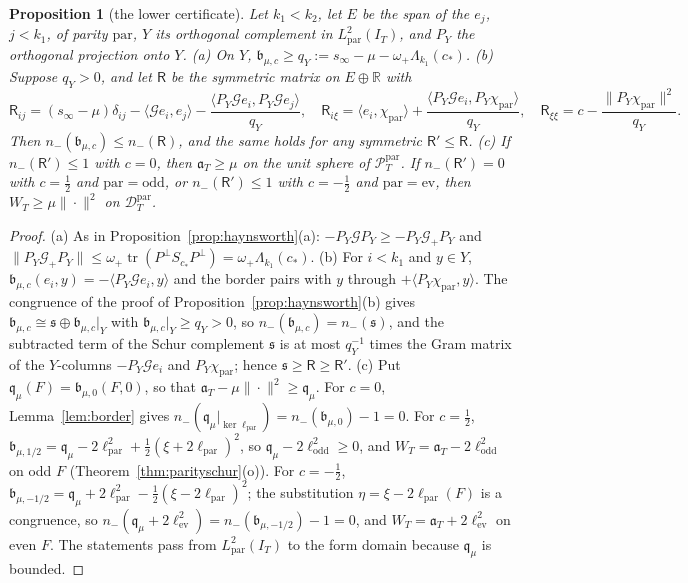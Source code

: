 \documentclass[11pt]{amsart}
\newtheorem{proposition}[theorem]{Proposition}
\theoremstyle{definition}
\theoremstyle{remark}
\newcommand{\R}{\mathbb R}
\newcommand{\PT}{\mathcal P_T}
\newcommand{\IT}{I_T}
\begin{document}
\begin{proposition}[the lower certificate]\label{prop:lowercert}
Let $k_1<k_2$, let $E$ be the span of the $e_j$, $j<k_1$, of parity $\mathrm{par}$, $Y$ its orthogonal
complement in $L^2_{\mathrm{par}}(\IT)$, and $P_Y$ the orthogonal projection onto $Y$.
\emph{(a)} On $Y$, $\mathfrak b_{\mu,c}\ge q_Y:=s_\infty-\mu-\omega_+\Lambda_{k_1}(c_*)$.
\emph{(b)} Suppose $q_Y>0$, and let $\mathsf R$ be the symmetric matrix on $E\oplus\R$ with
\[
\mathsf R_{ij}=(s_\infty-\mu)\delta_{ij}-\langle\mathcal Ge_i,e_j\rangle
-\frac{\langle P_Y\mathcal Ge_i,P_Y\mathcal Ge_j\rangle}{q_Y},\quad
\mathsf R_{i\xi}=\langle e_i,\chi_{\mathrm{par}}\rangle+\frac{\langle P_Y\mathcal Ge_i,P_Y\chi_{\mathrm{par}}\rangle}{q_Y},\quad
\mathsf R_{\xi\xi}=c-\frac{\|P_Y\chi_{\mathrm{par}}\|^2}{q_Y}.
\]
Then $n_-(\mathfrak b_{\mu,c})\le n_-(\mathsf R)$, and the same holds for any symmetric $\mathsf R'\le\mathsf R$.
\emph{(c)} If $n_-(\mathsf R')\le1$ with $c=0$, then $\mathfrak a_T\ge\mu$ on the unit sphere of
$\PT^{\mathrm{par}}$. If $n_-(\mathsf R')=0$ with $c=\frac12$ and $\mathrm{par}=\mathrm{odd}$, or $n_-(\mathsf R')\le1$ with
$c=-\frac12$ and $\mathrm{par}=\mathrm{ev}$, then $W_T\ge\mu\|\cdot\|^2$ on $\mathcal D^{\mathrm{par}}_T$.
\end{proposition}
\begin{proof}
(a) As in Proposition~\ref{prop:haynsworth}(a): $-P_Y\mathcal GP_Y\ge-P_Y\mathcal G_+P_Y$ and
$\|P_Y\mathcal G_+P_Y\|\le\omega_+\operatorname{tr}(P^\perp S_{c_*}P^\perp)=\omega_+\Lambda_{k_1}(c_*)$.
(b) For $i<k_1$ and $y\in Y$, $\mathfrak b_{\mu,c}(e_i,y)=-\langle P_Y\mathcal Ge_i,y\rangle$ and the border pairs
with $y$ through $+\langle P_Y\chi_{\mathrm{par}},y\rangle$. The congruence of the proof of
Proposition~\ref{prop:haynsworth}(b) gives $\mathfrak b_{\mu,c}\cong\mathfrak s\oplus\mathfrak b_{\mu,c}|_Y$ with
$\mathfrak b_{\mu,c}|_Y\ge q_Y>0$, so $n_-(\mathfrak b_{\mu,c})=n_-(\mathfrak s)$, and the subtracted term of the Schur
complement $\mathfrak s$ is at most $q_Y^{-1}$ times the Gram matrix of the $Y$-columns
$-P_Y\mathcal Ge_i$ and $P_Y\chi_{\mathrm{par}}$; hence $\mathfrak s\ge\mathsf R\ge\mathsf R'$.
(c) Put $\mathfrak q_\mu(F)=\mathfrak b_{\mu,0}(F,0)$, so that $\mathfrak a_T-\mu\|\cdot\|^2\ge\mathfrak q_\mu$. For
$c=0$, Lemma~\ref{lem:border} gives $n_-(\mathfrak q_\mu|_{\ker\ell_{\mathrm{par}}})=n_-(\mathfrak b_{\mu,0})-1=0$. For
$c=\frac12$, $\mathfrak b_{\mu,1/2}=\mathfrak q_\mu-2\ell_{\mathrm{par}}^2+\frac12(\xi+2\ell_{\mathrm{par}})^2$, so
$\mathfrak q_\mu-2\ell_{\mathrm{odd}}^2\ge0$, and $W_T=\mathfrak a_T-2\ell_{\mathrm{odd}}^2$ on odd $F$
(Theorem~\ref{thm:parityschur}(o)). For $c=-\frac12$,
$\mathfrak b_{\mu,-1/2}=\mathfrak q_\mu+2\ell_{\mathrm{par}}^2-\frac12(\xi-2\ell_{\mathrm{par}})^2$; the substitution
$\eta=\xi-2\ell_{\mathrm{par}}(F)$ is a congruence, so
$n_-(\mathfrak q_\mu+2\ell_{\mathrm{ev}}^2)=n_-(\mathfrak b_{\mu,-1/2})-1=0$, and $W_T=\mathfrak a_T+2\ell_{\mathrm{ev}}^2$ on even
$F$. The statements pass from $L^2_{\mathrm{par}}(\IT)$ to the form domain because $\mathfrak q_\mu$ is bounded.
\end{proof}
\end{document}
